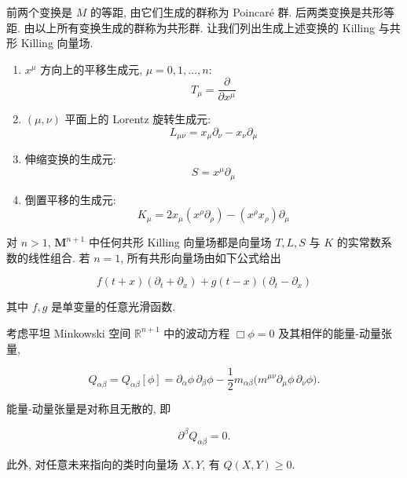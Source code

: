 前两个变换是 $M$ 的等距, 由它们生成的群称为 Poincar\'e 群. 后两类变换是共形等距. 由以上所有变换生成的群称为共形群. 让我们列出生成上述变换的 Killing 与共形 Killing 向量场. 

\begin{enumerate}
\renewcommand{\labelenumi}{\roman{enumi}.}
\item $x^{\mu}$ 方向上的平移生成元, $\mu = 0,  1,  \ldots,  n$:
\[
T_{\mu} = \frac{\partial}{\partial x^{\mu}}
\]
\item $(\mu,  \nu)$ 平面上的 Lorentz 旋转生成元:
\[
L_{\mu\nu} = x_{\mu}\partial_{\nu} - x_{\nu}\partial_{\mu}
\]
\item 伸缩变换的生成元:
\[
S = x^{\mu}\partial_{\mu}
\]
\item 倒置平移的生成元:
\[
K_{\mu} = 2x_{\mu}(x^{\rho}\partial_{\rho}) - (x^{\rho}x_{\rho})\partial_{\mu}
\]
\end{enumerate}

\begin{theorem}\label{thm:cG-4.7}
对 $n > 1$, $\mathbf{M}^{n + 1}$ 中任何共形 Killing 向量场都是向量场 $T,  L,  S$ 与 $K$ 的实常数系数的线性组合. 若 $n = 1$, 所有共形向量场由如下公式给出

\[
f (t + x) (\partial_ {t} + \partial_ {x}) + g (t - x) (\partial_ {t} - \partial_ {x})
\]

其中 $f,  g$ 是单变量的任意光滑函数. 
\end{theorem}

考虑平坦 Minkowski 空间 $\mathbb{R}^{n+1}$ 中的波动方程 $\Box\phi=0$ 及其相伴的能量-动量张量, 

\[
Q_{\alpha\beta} = Q_{\alpha\beta}[\phi] = \partial_{\alpha}\phi\, \partial_{\beta}\phi - \frac{1}{2}m_{\alpha\beta}\big(m^{\mu\nu}\partial_{\mu}\phi\, \partial_{\nu}\phi\big).
\]

\begin{proposition}\label{prop:cG-4.9}
能量-动量张量是对称且无散的, 即

\[
\partial^{\beta}Q_{\alpha\beta} = 0.
\]

此外, 对任意未来指向的类时向量场 $X,  Y$, 有 $Q(X,  Y) \geq 0$. 
\end{proposition}

